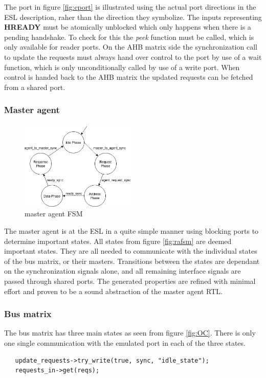 The port in figure \ref{fig:cport} is illustrated using the actual port directions in the ESL description, raher than the direction they symbolize. The inputs representing \textbf{HREADY} must be atomically unblocked which only happens when there is a pending handshake. To check for this the \textit{peek} function must be called, which is only available for reader ports. On the AHB matrix side the synchronization call to update the requests must always hand over control to the port by use of a wait function, which is only unconditionally called by use of a write port. When control is handed back to the AHB matrix the updated requests can be fetched from a shared port. 

\subsubsection{Master agent}
\begin{figure}
\includegraphics[width=5.5cm]{figs/ESL/mAgent_ESL.png}
\caption{master agent FSM}\label{fig:eafsm}
\end{figure}
The master agent is at the ESL in a quite simple manner using blocking ports to determine important states. All states from figure \ref{fig:rafsm} are deemed important states. They are all needed to communicate with the individual states of the bus matrix, or their masters. Transitions between the states are dependant on the synchronization signals alone, and all remaining interface signals are passed through shared ports. The generated properties are refined with minimal effort and proven to be a sound abstraction of the master agent RTL.  \\
\newline  

\subsubsection{Bus matrix}
The bus matrix has three main states as seen from figure \ref{fig:OC}. There is only one single communication with the emulated port in each of the three states. 
\begin{lstlisting}
   update_requests->try_write(true, sync, "idle_state");
   requests_in->get(reqs);
\end{lstlisting}

